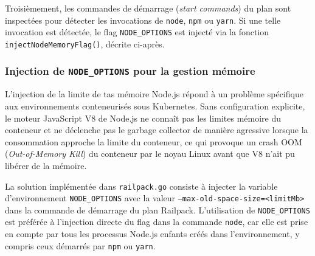 Troisièmement, les commandes de démarrage (\textit{start commands}) du plan sont inspectées pour détecter les invocations de \texttt{node}, \texttt{npm} ou \texttt{yarn}. Si une telle invocation est détectée, le flag \texttt{NODE\_OPTIONS} est injecté via la fonction \texttt{injectNodeMemoryFlag()}, décrite ci-après.

\subsubsection*{Injection de \texttt{NODE\_OPTIONS} pour la gestion mémoire}

L'injection de la limite de tas mémoire Node.js répond à un problème spécifique aux environnements conteneurisés sous Kubernetes. Sans configuration explicite, le moteur JavaScript V8 de Node.js ne connaît pas les limites mémoire du conteneur et ne déclenche pas le garbage collector de manière agressive lorsque la consommation approche la limite du conteneur, ce qui provoque un crash OOM (\textit{Out-of-Memory Kill}) du conteneur par le noyau Linux avant que V8 n'ait pu libérer de la mémoire. 

La solution implémentée dans \texttt{railpack.go} consiste à injecter la variable d'environnement \texttt{NODE\_OPTIONS} avec la valeur \texttt{--max-old-space-size=<limitMb>} dans la commande de démarrage du plan Railpack. L'utilisation de \texttt{NODE\_OPTIONS} est préférée à l'injection directe du flag dans la commande \texttt{node}, car elle est prise en compte par tous les processus Node.js enfants créés dans l'environnement, y compris ceux démarrés par \texttt{npm} ou \texttt{yarn}. 

